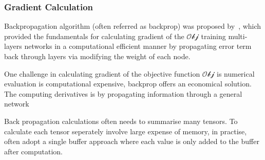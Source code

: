 \subsubsection{Gradient Calculation}
Backpropagation algorithm (often referred as backprop) was proposed by~\citet{werbos1975beyond}, which provided the fundamentals for calculating gradient of the $\mathcal{Obj}$ training multi-layers networks in a computational efficient manner by propagating error term back through layers via modifying the weight of each node. 
\par
One challenge in calculating gradient of the objective function $\mathcal{Obj}$ is numerical evaluation is computational expensive, backprop offers an economical solution. The computing derivatives is by propagating information through a general network 
\par 
Back propagation calculations often needs to summarise many tensors. To calculate each tensor seperately involve large expense of memory, in practise, often adopt a single buffer approach where each value is only added to the buffer after computation.